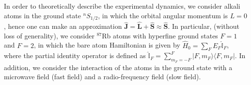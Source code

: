 \documentclass[%
reprint,
 amsmath,amssymb,
 aps,
floatfix,
]{revtex4-1}
\newcommand{\HM}[2][blue]{\textcolor{#1}{ #2}}
\begin{document}

In order to theoretically describe the experimental dynamics, we consider alkali atoms in the ground state $^n S_{1/2}$, in which the orbital angular momentum is $L=0$, hence one can make an approximation  $\hat{\mathbf{J}}=\hat{\mathbf{L}}+\hat{\mathbf{S}}\approx \hat{\mathbf{S}}$. In particular, (without loss of generality), we consider $^{87}$Rb atoms with hyperfine ground states $F=1$ and $F=2$, in which the bare atom Hamiltonian is given by
$\hat{H}_0=\sum_F E_F \hat{\mathbb{I}}_F$, 
where the partial identity operator is defined as 
$\hat{\mathbb{I}}_F=\sum_{m_F=-F}^F |F, m_F\rangle \langle F, m_F|.$
In addition, we consider the interaction of the atoms in the ground state with a microwave field \cite{sinuco19}
(fast field) and a radio-frequency field (slow field).
\end{document}
